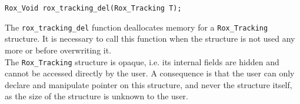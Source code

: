 
\begin{lstlisting}
Rox_Void rox_tracking_del(Rox_Tracking T);
\end{lstlisting}
The \lstinline$rox_tracking_del$ function deallocates memory for a \lstinline$Rox_Tracking$ structure. 
It is necessary to call this function when the structure is not used any more or before overwriting it. \\

The \lstinline$Rox_Tracking$ structure is opaque, i.e. its internal fields are hidden
and cannot be accessed directly by the user. A
consequence is that the user can only declare and manipulate pointer on this
structure, and never the structure itself, as the size of the structure 
is unknown to the user.\\


